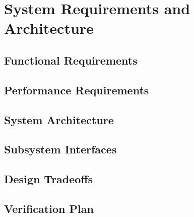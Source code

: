 \chapter{System Requirements and Architecture}

\section{Functional Requirements}

\section{Performance Requirements}

\section{System Architecture}

\section{Subsystem Interfaces}

\section{Design Tradeoffs}

\section{Verification Plan}
